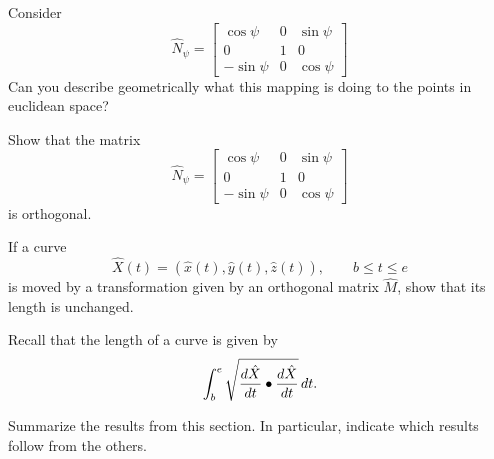 \documentclass{ximera}
\begin{document}
\begin{problem}
  Consider
  \[
  \hat{N}_\psi=\begin{bmatrix}
  \cos\psi & 0 & \sin\psi\\
  0 & 1 & 0\\
  -\sin\psi & 0 & \cos\psi
  \end{bmatrix}
  \]
  Can you describe geometrically what this mapping is doing
  to the points in euclidean space?
\end{problem}


\begin{problem}
Show that the matrix
\[
\hat{N}_\psi=\begin{bmatrix}
\cos\psi & 0 & \sin\psi\\
0 & 1 & 0\\
-\sin\psi & 0 & \cos\psi
\end{bmatrix}
\]
is orthogonal.
\end{problem}


\begin{problem}
If a curve
\[
\hat{X}(t) = \left(\hat{x}(t),\hat{y}(t),\hat{z}(t)\right),\qquad b\le t\le e
\]
is moved by a transformation given by an orthogonal matrix $\hat{M}$,
show that its length is unchanged.
\begin{hint}
  Recall that the length of a curve is given by
\[
\int_{b}^{e} \sqrt{\frac{d\hat{X}}{dt} \bullet \frac{d\hat{X}}{dt}}\,d t.
\]  
\end{hint}
\end{problem}


\begin{problem}
Summarize the results from this section. In particular, indicate which
results follow from the others.
\begin{freeResponse}
\end{freeResponse}
\end{problem}
\end{document}
